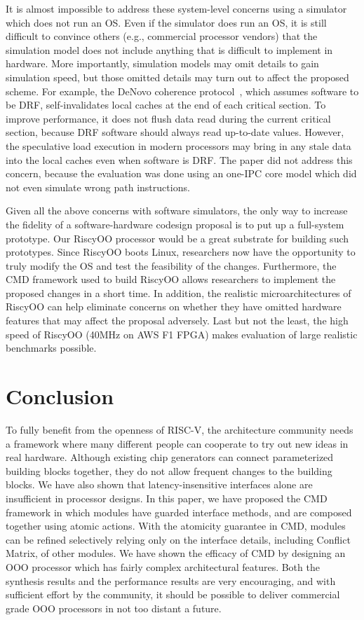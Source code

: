 \documentclass[conference]{IEEEtran}
\begin{document}
It is almost impossible to address these system-level concerns using a simulator which does not run an OS.
Even if the simulator does run an OS, it is still difficult to convince others (e.g., commercial processor vendors) that the simulation model does not include anything that is difficult to implement in hardware.
More importantly, simulation models may omit details to gain simulation speed, but those omitted details may turn out to affect the proposed scheme.
For example, the DeNovo coherence protocol~\cite{DeNoVo}, which assumes software to be DRF, self-invalidates local caches at the end of each critical section.
To improve performance, it does not flush data read during the current critical section, because DRF software should always read up-to-date values.
However, the speculative load execution in modern processors may bring in any stale data into the local caches even when software is DRF.
The paper did not address this concern, because the evaluation was done using an one-IPC core model which did not even simulate wrong path instructions.

Given all the above concerns with software simulators, the only way to increase the fidelity of a software-hardware codesign proposal is to put up a full-system prototype.
Our RiscyOO processor would be a great substrate for building such prototypes.
Since RiscyOO boots Linux, researchers now have the opportunity to truly modify the OS and test the feasibility of the changes.
Furthermore, the CMD framework used to build RiscyOO allows researchers to implement the proposed changes in a short time.
In addition, the realistic microarchitectures of RiscyOO can help eliminate concerns on whether they have omitted hardware features that may affect the proposal adversely.
Last but not the least, the high speed of RiscyOO (40MHz on AWS F1 FPGA) makes evaluation of large realistic benchmarks possible.


\section{Conclusion}\label{sec:conclude}
To fully benefit from the openness of RISC-V, the architecture community needs a framework where many different people can cooperate to try out new ideas in real hardware.
Although existing chip generators can connect parameterized building blocks together,  they do not allow frequent changes to the building blocks.
We have also shown that latency-insensitive interfaces alone are insufficient in processor designs.
In this paper, we have proposed the CMD framework in which modules have guarded interface methods, and are composed together using atomic actions. 
With the atomicity guarantee in CMD, modules can be refined selectively relying only on the interface details, including Conflict Matrix, of other modules.
We have shown the efficacy of CMD by designing an OOO processor which has fairly complex architectural features.
Both the synthesis results and the performance results are very encouraging, and with sufficient effort by the community, it should be possible to deliver commercial grade OOO processors in not too distant a future.
\end{document}

